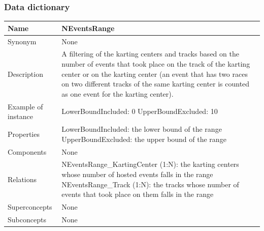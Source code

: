\documentclass{beamer}
\begin{document}
\begin{frame}
    \frametitle{Data dictionary}
    \begin{table}
    \tiny
    \begin{tabular}{|p{2cm}|p{6cm}|}
    \hline
    Name & \textbf{NEventsRange} \\
    \hline
    Synonym & None \\
    \hline
    Description & A filtering of the karting centers and tracks based on the number of
    events that took place on the track of the karting center or on the karting center
    (an event that has two races on two different tracks of the same karting center 
    is counted as one event for the karting center). \\
    \hline
    Example of instance &
    LowerBoundIncluded: 0 \newline
    UpperBoundExcluded: 10 \\
    \hline
    Properties &
    LowerBoundIncluded: the lower bound of the range \newline
    UpperBoundExcluded: the upper bound of the range \\
    \hline
    Components & None \\
    \hline
    Relations &
    NEventsRange\_KartingCenter (1:N): the karting centers whose number of hosted events falls in the range \newline
    NEventsRange\_Track (1:N): the tracks whose number of events that took place on them falls in the range \\
    \hline
    Superconcepts & None \\
    \hline
    Subconcepts & None \\
    \hline
    \end{tabular}
    \end{table}
\end{frame}
\end{document}
